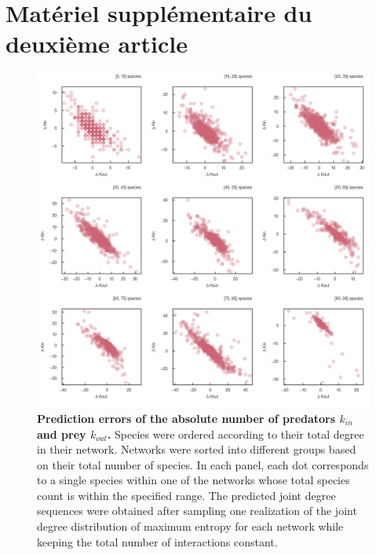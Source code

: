 
\francais   

\setcounter{figure}{0}
\renewcommand{\thefigure}{B\arabic{figure}}

\setcounter{table}{0}
\renewcommand{\thetable}{\arabic{chapter}.\arabic{table}}

\chapter{Matériel supplémentaire du deuxième article}\label{supp:B}

\begin{figure}[h]
    \centering
    \includegraphics[width=\textwidth]{figures/S_article2/kin_kout_difference_strata.png}
    \caption{\textbf{Prediction errors of the absolute number of predators $k_{in}$ and prey
    $k_{out}$.} Species were ordered according to their total degree in their
    network. Networks were sorted into different groups based on their total number
    of species. In each panel, each dot corresponds to a single species within one
    of the networks whose total species count is within the specified range. The
    predicted joint degree sequences were obtained after sampling one realization of
    the joint degree distribution of maximum entropy for each network while keeping
    the total number of interactions
    constant.}
    \label{fig:kin_kout_diff_strata}
\end{figure}

